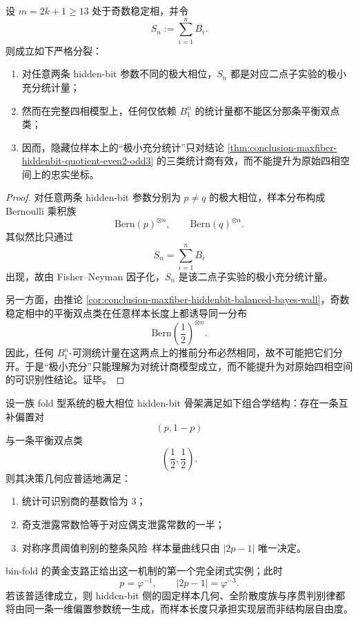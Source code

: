 \begin{theorem}[奇数稳定相中最小充分统计与原始相位可识别性的严格分裂]\label{thm:conclusion-maxfiber-hiddenbit-sufficiency-vs-identifiability-split}
设 \(m=2k+1\ge 13\) 处于奇数稳定相，并令
\[
S_n:=\sum_{i=1}^{n}B_i.
\]
则成立如下严格分裂：
\begin{enumerate}
\normalfont
  \item 对任意两条 hidden-bit 参数不同的极大相位，\(S_n\) 都是对应二点子实验的极小充分统计量；
  \item 然而在完整四相模型上，任何仅依赖 \(B_1^n\) 的统计量都不能区分那条平衡双点类；
  \item 因而，隐藏位样本上的“极小充分统计”只对结论 \ref{thm:conclusion-maxfiber-hiddenbit-quotient-even2-odd3} 的三类统计商有效，而不能提升为原始四相空间上的忠实坐标。
\end{enumerate}
\end{theorem}

\begin{proof}
对任意两条 hidden-bit 参数分别为 \(p\neq q\) 的极大相位，样本分布构成 Bernoulli 乘积族
\[
\mathrm{Bern}(p)^{\otimes n},
\qquad
\mathrm{Bern}(q)^{\otimes n}.
\]
其似然比只通过
\[
S_n=\sum_{i=1}^n B_i
\]
出现，故由 Fisher--Neyman 因子化，\(S_n\) 是该二点子实验的极小充分统计量。

另一方面，由推论 \ref{cor:conclusion-maxfiber-hiddenbit-balanced-bayes-wall}，奇数稳定相中的平衡双点类在任意样本长度上都诱导同一分布
\[
\mathrm{Bern}\!\left(\frac12\right)^{\otimes n}.
\]
因此，任何 \(B_1^n\)-可测统计量在这两点上的推前分布必然相同，故不可能把它们分开。于是“极小充分”只能理解为对统计商模型成立，而不能提升为对原始四相空间的可识别性结论。证毕。
\end{proof}

\begin{conjecture}\label{conj:conclusion-maxfiber-hiddenbit-complementary-plus-balanced-universality}
设一族 fold 型系统的极大相位 hidden-bit 骨架满足如下组合学结构：存在一条互补偏置对
\[
(p,1-p)
\]
与一条平衡双点类
\[
\left(\frac12,\frac12\right).
\]
则其决策几何应普适地满足：
\begin{enumerate}
\normalfont
  \item 统计可识别商的基数恰为 \(3\)；
  \item 奇支泄露常数恰等于对应偶支泄露常数的一半；
  \item 对称序贯阈值判别的整条风险--样本量曲线只由 \(|2p-1|\) 唯一决定。
\end{enumerate}
bin-fold 的黄金支路正给出这一机制的第一个完全闭式实例；此时
\[
p=\varphi^{-1},
\qquad
|2p-1|=\varphi^{-3}.
\]
若该普适律成立，则 hidden-bit 侧的固定样本几何、全阶散度族与序贯判别律都将由同一条一维偏置参数统一生成，而样本长度只承担实现层而非结构层自由度。
\end{conjecture}

\endinput

